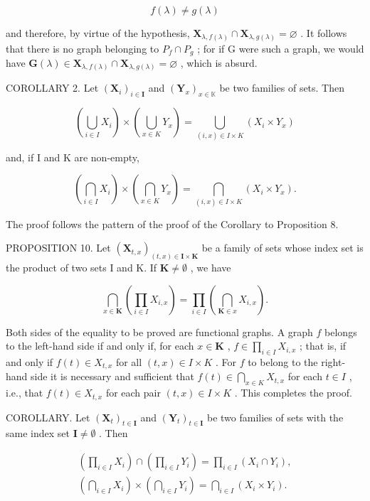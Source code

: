 \[
f (\lambda) \neq g (\lambda)
\]

and therefore, by virtue of the hypothesis, \(\mathbf{X}_{\lambda,f(\lambda)} \cap \mathbf{X}_{\lambda,g(\lambda)} = \varnothing\) . It follows that there is no graph belonging to \(P_{f} \cap P_{g}\) ; for if G were such a graph, we would have \(\mathbf{G}(\lambda) \in \mathbf{X}_{\lambda,f(\lambda)} \cap \mathbf{X}_{\lambda,g(\lambda)} = \varnothing\) , which is absurd.

COROLLARY 2. Let \((\mathbf{X}_i)_{i\in \mathbf{I}}\) and \((\mathbf{Y}_x)_{x\in \mathbb{K}}\) be two families of sets. Then

\[
\left(\bigcup_ {i \in I} X _ {i}\right) \times \left(\bigcup_ {x \in K} Y _ {x}\right) = \bigcup_ {(i, x) \in I \times K} (X _ {i} \times Y _ {x})
\]

and, if I and K are non-empty,

\[
\left(\bigcap_ {i \in I} X _ {i}\right) \times \left(\bigcap_ {x \in K} Y _ {x}\right) = \bigcap_ {(i, x) \in I \times K} (X _ {i} \times Y _ {x}).
\]

The proof follows the pattern of the proof of the Corollary to Proposition 8.

PROPOSITION 10. Let \((\mathbf{X}_{t,x})_{(t,x)\in \mathbf{I}\times \mathbf{K}}\) be a family of sets whose index set is the product of two sets I and K. If \(\mathbf{K}\neq \emptyset\) , we have

\[
\bigcap_ {x \in \mathbf {K}} \left(\prod_ {i \in I} X _ {i, x}\right) = \prod_ {i \in I} \left(\bigcap_ {\mathbf {K} \in x} X _ {i, x}\right).
\]

Both sides of the equality to be proved are functional graphs. A graph \(f\) belongs to the left-hand side if and only if, for each \(x \in \mathbf{K}\) , \(f \in \prod_{i \in I} X_{i,x}\) ; that is, if and only if \(f(t) \in X_{t,x}\) for all \((t,x) \in I \times K\) . For \(f\) to belong to the right-hand side it is necessary and sufficient that \(f(t) \in \bigcap_{x \in K} X_{t,x}\) for each \(t \in I\) , i.e., that \(f(t) \in X_{t,x}\) for each pair \((t, x) \in I \times K\) . This completes the proof.

COROLLARY. Let \((\mathbf{X}_t)_{t\in \mathbf{I}}\) and \((\mathbf{Y}_t)_{t\in \mathbf{I}}\) be two families of sets with the same index set \(\mathbf{I}\neq \emptyset\) . Then

\[
\begin{array}{l} \left(\prod_ {i \in I} X _ {i}\right) \cap \left(\prod_ {i \in I} Y _ {i}\right) = \prod_ {i \in I} (X _ {i} \cap Y _ {i}), \\ \left(\bigcap_ {i \in I} X _ {i}\right) \times \left(\bigcap_ {i \in I} Y _ {i}\right) = \bigcap_ {i \in I} (X _ {i} \times Y _ {i}). \end{array}
\]

